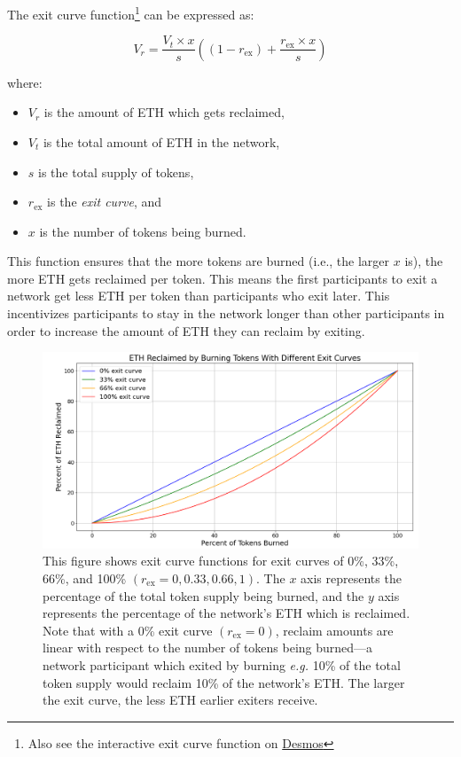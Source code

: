 \documentclass{article}
\begin{document}
The exit curve function\footnote{Also see the interactive exit curve function on \href{https://www.desmos.com/calculator/9pewqesyj5}{Desmos}} can be expressed as:

\begin{equation}
  V_r = \frac{V_t \times x}{s}\left(\left(1-r_{\text{ex}}\right)+\frac{r_{\text{ex}} \times x}{s}\right)
\end{equation}

where:
\begin{itemize}
  \item $V_r$ is the amount of ETH which gets reclaimed,
  \item $V_t$ is the total amount of ETH in the network,
  \item $s$ is the total supply of tokens,
  \item $r_{\text{ex}}$ is the \textit{exit curve}, and
  \item $x$ is the number of tokens being burned.
\end{itemize}

This function ensures that the more tokens are burned (i.e., the larger $x$ is), the more ETH gets reclaimed per token. This means the first participants to exit a network get less ETH per token than participants who exit later. This incentivizes participants to stay in the network longer than other participants in order to increase the amount of ETH they can reclaim by exiting.

\begin{figure}[ht]
  \centering
  \includegraphics[width=\textwidth]{figures/multi-exit-curves.png}
  \caption{This figure shows exit curve functions for exit curves of 0\%, 33\%, 66\%, and 100\% $(r_{\text{ex}} = 0, 0.33, 0.66, 1)$. The $x$ axis represents the percentage of the total token supply being burned, and the $y$ axis represents the percentage of the network's ETH which is reclaimed. Note that with a 0\% exit curve $(r_{\text{ex}} = 0)$, reclaim amounts are linear with respect to the number of tokens being burned---a network participant which exited by burning \textit{e.g.} 10\% of the total token supply would reclaim 10\% of the network's ETH. The larger the exit curve, the less ETH earlier exiters receive.}
\end{figure}
\end{document}
